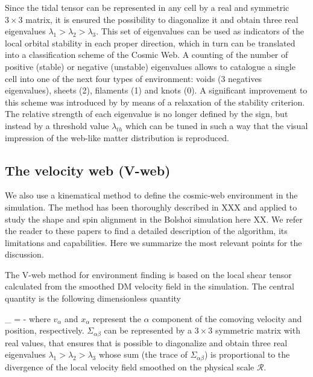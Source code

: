 \documentclass[a4,useAMS,usenatbib,usegraphicx]{latex/mn2e}
\begin{document}
Since the tidal tensor can be represented in any cell by a real and 
symmetric $3\times 3$ matrix, it is ensured the possibility to diagonalize 
it and obtain three real eigenvalues $\lambda_{1} > \lambda_{2}>\lambda_3$.
This set of eigenvalues can be used as indicators of the local orbital 
stability in each proper direction, which in turn can be translated into 
a classification scheme of the Cosmic Web. A counting of the number of 
positive (stable) or negative (unstable) eigenvalues allows to catalogue
a single cell into one of the next four types of environment: voids (3 
negatives eigenvalues), sheets (2), filaments (1) and knots (0). A 
significant improvement to this scheme was introduced by \citet{Forero09}
by means of a relaxation of the stability criterion. The relative strength 
of each eigenvalue is no longer defined by the sign, but instead by a
threshold value $\lambda_{th}$ which can be tuned in such a way that the
visual impression of the web-like matter distribution is reproduced.



\subsection{The velocity  web (V-web)}
\label{subsec:Vweb}



We also use a kinematical method to define the cosmic-web environment in 
the simulation. The method has been thoroughly described in XXX and 
applied to study the shape and spin alignment in the Bolshoi simulation 
here XX. We refer the reader to these papers to find a detailed 
description of the algorithm, its limitations and capabilities. Here we 
summarize the most relevant points for the discussion. 



The V-web method for environment finding is based on the local shear 
tensor calculated from the smoothed DM velocity field in the simulation.
The central quantity is the following dimensionless quantity 


{
\Sigma_{\alpha\beta} = -
}
where $v_{\alpha}$ and $x_{\alpha}$ represent the $\alpha$ component of 
the comoving velocity and position, respectively. $\Sigma_{\alpha\beta}$ 
can be represented by a $3\times 3$ symmetric matrix with real values,
that ensures that is possible to diagonalize and obtain three real 
eigenvalues $\lambda_{1} > \lambda_{2}>\lambda_3$ whose sum (the trace of
$\Sigma_{\alpha\beta}$) is proportional to the divergence of the local 
velocity field smoothed on the physical scale ${\mathcal R}$. 
\end{document}

